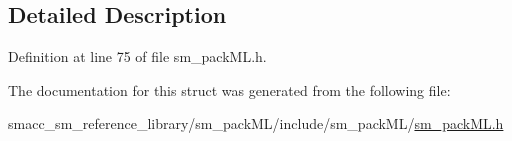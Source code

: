 \subsection{Detailed Description}


Definition at line 75 of file sm\+\_\+pack\+M\+L.\+h.



The documentation for this struct was generated from the following file\+:\begin{DoxyCompactItemize}
\item 
smacc\+\_\+sm\+\_\+reference\+\_\+library/sm\+\_\+pack\+M\+L/include/sm\+\_\+pack\+M\+L/\hyperlink{sm__packML_8h}{sm\+\_\+pack\+M\+L.\+h}\end{DoxyCompactItemize}
